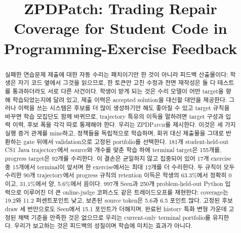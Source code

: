 \documentclass[10pt,conference]{IEEEtran}
\title{ZPDPatch: Trading Repair Coverage for Student Code in Programming-Exercise Feedback}
\author{}
\begin{document}
\maketitle
\begin{abstract}
실패한 연습문제 제출에 대한 자동 수리는 패치이기만 한 것이 아니라 피드백 산출물이다: 학생은 자기 코드 옆에서 그것을 읽으므로, 한 토큰만 고친 수정과 전면 재작성은 둘 다 테스트를 통과하더라도 서로 다른 사건이다. 학생이 받게 되는 것은 수리 모델이 어떤 target을 향해 학습되었는지에 달려 있고, 제출 이력은 accepted solution을 대신할 대안을 제공한다. 그러나 이력을 쓰는 시스템은 후보를 더 많이 생성하기만 해도 좋아질 수 있고 target 규칙을 바꾸면 학습 모집단도 함께 바뀌므로, trajectory 특유의 이득을 말하려면 target 구성과 입력 이력, 후보 폭을 각각 따로 통제해야 한다. 우리는 \textsc{ZPDPatch}를 제시한다. 이것은 세 가지 실행 증거 관계를 mine하고, 정책들을 독립적으로 학습하며, 회귀 대신 제출물을 그대로 반환하는 gate 뒤에서 validation으로 고정된 portfolio를 선택한다. 181개 student-held-out CS1 Java trajectory에서 source와 개수를 맞춘 학습 하에 terminal target은 155개를, progress target은 92개를 수리한다. 이 결손은 균일하지 않고 집중되어 있어 17개 exercise 중 15개에서 terminal이 앞서며 한 exercise에서는 최대 12개를 더 수리한다. 두 규칙이 모두 수리한 90개 trajectory에서 progress 규칙의 retention 이득은 학생의 63.3\%에서 정확히 0이고, 31.1\%에서 양, 5.6\%에서 음이다. 997개 Seen과 250개 problem-held-out Python 입력으로 이루어진 더 큰 online-judge 코퍼스도 같은 트레이드오프를 재현한다: coverage는 19.2와 11.2 퍼센트포인트 낮고, 보존된 source token은 5.6과 6.5 포인트 많다. 고정된 후보 draw 세 번만으로도 Seen에서 15.1 포인트가 더해지며, 완료된 history 특화 변형 가운데 고정된 채택 기준을 만족한 것은 없으므로 우리는 current-only terminal portfolio를 유지한다. 우리가 보고하는 것은 피드백의 성질이며 학습에 미치는 효과가 아니다.

\end{abstract}
\end{document}
